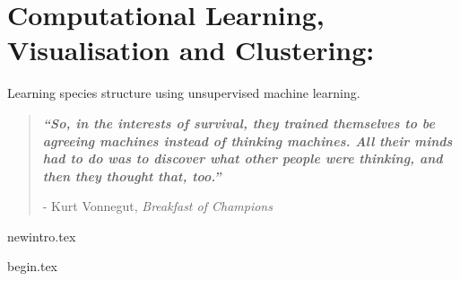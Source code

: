 

\chapter{ Computational Learning, Visualisation and Clustering:}
\vspace{-1cm} {\Large Learning species structure using unsupervised machine learning. } 


\blankpage
\restoregeometry
\vspace*{0.15\paperheight}


\begin{center}
\begin{quotation}
  \large{\emph{\textbf{``So, in the interests of survival, they trained themselves to be agreeing machines instead of thinking machines. All their minds had to do was to discover what other people were thinking, and then they thought that, too.''} }  }  \\
  \begin{flushright}
  - Kurt Vonnegut, \textit{Breakfast of Champions} 
  \end{flushright}
 \end{quotation}
\end{center}
\doublespacing
\newpage

%
{newintro.tex}

% 
 {begin.tex}
% 
% 



\chapterbib






